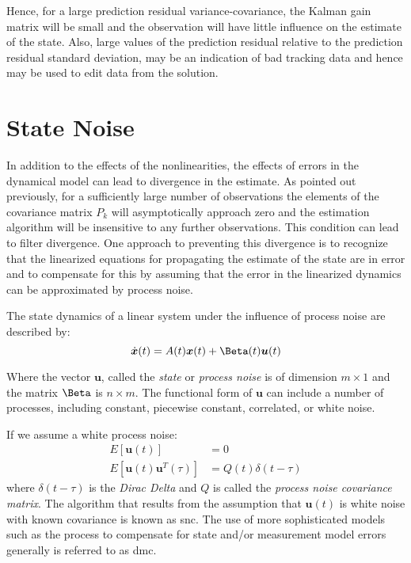 Hence, for a large prediction residual variance-covariance, the Kalman gain matrix 
will be small and the observation will have little influence on the estimate of the 
state. Also, large values of the prediction residual relative to the prediction residual 
standard deviation, may be an indication of bad tracking data and hence may be used to 
edit data from the solution.

\section{State Noise}
In addition to the effects of the nonlinearities, the effects of errors in the dynamical 
model can lead to divergence in the estimate. As pointed out previously, for a sufficiently large
number of observations the elements of the covariance matrix \(P_k\) will asymptotically 
approach zero and the estimation algorithm will be insensitive to any further
observations. This condition can lead to filter divergence. One approach to preventing 
this divergence is to recognize that the linearized equations for propagating the 
estimate of the state are in error and to compensate for this by assuming
that the error in the linearized dynamics can be approximated by process noise.

The state dynamics of a linear system under the influence of process noise are
described by:
\begin{equation}
  \label{eq:tapley491}
  \dot{\bm{x}} (t) = A(t) \bm{x} (t) + \Beta (t) \bm{u} (t)
\end{equation}

Where the vector \(\bm{u}\), called the \emph{state} or \emph{process noise} is of 
dimension \(m \times 1 \) and the matrix \(\Beta \) is \(n \times m \).
The functional form of \(\bm{u}\) can include a number of processes, including constant, 
piecewise constant, correlated, or white noise.

If we assume a white process noise:
\begin{equation}
  \label{eq:tapley492}
  \begin{aligned}
    E \left[ \bm{u} (t) \right] &= 0 \\
    E \left[ \bm{u} (t) \bm{u}^T (\tau) \right] &= Q(t) \delta (t-\tau)
  \end{aligned}
\end{equation}
where \(\delta (t-\tau)\) is the \emph{Dirac Delta} and \(Q\) is called the 
\emph{process noise covariance matrix}. The algorithm that results from the assumption 
that \( \bm{u} (t) \) is white noise with known covariance is known as \gls{snc}. 
The use of more sophisticated models such as the process to compensate for state 
and/or measurement model errors generally is referred to as \gls{dmc}.

